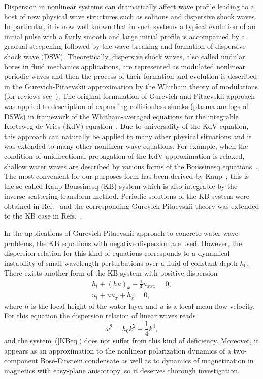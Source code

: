 \documentclass[pre,aps,superscriptaddress,twocolumn,floatfix]{revtex4-1}
\begin{document}
Dispersion in nonlinear systems can dramatically affect wave profile leading to a host
of new physical wave structures such as solitons and dispersive shock waves. In particular,
it is now well known that in such systems a typical evolution of an initial pulse with
a fairly smooth and large initial profile is accompanied by a gradual steepening followed
by the wave breaking and formation of dispersive shock wave (DSW). Theoretically,
dispersive shock waves, also called undular bores in fluid mechanics applications,
are represented as modulated nonlinear periodic waves and then the process of their
formation and evolution is described in the Gurevich-Pitaevskii approximation
\cite{GurevichPitaevskii-73} by the Whitham theory of modulations \cite{Whitham-65}
(for reviews see~\cite{ElHoefer-16,Kamchatnov-21}). The original formulation of
Gurevich and Pitaevskii approach was applied to description of expanding collisionless shocks
(plasma analogs of DSWs) in framework of the Whitham-averaged equations for the integrable
Korteweg-de Vries (KdV) equation~\cite{KortewegVries-95,BenjaminLighthill-54}.
Due to universality of the KdV equation, this approach can naturally be applied
to many other physical situations and it was extended to many other nonlinear wave
equations. For example, when the condition of unidirectional
propagation of the KdV approximation is relaxed, shallow water waves are described by
various forms of the Boussinesq equations~\cite{Boussinesq-77}. The most convenient
for our purposes form has been derived by Kaup~\cite{Kaup-75}; this is the so-called
Kaup-Boussinesq (KB) system which is also integrable by the inverse scattering transform
method. Periodic solutions of the KB system were obtained in Ref.~\cite{MatveevYavor-79}
and the corresponding Gurevich-Pitaevskii theory was extended to the KB case in
Refs.~\cite{ElGrimshawPavlov-01,ElGrimshawKamchatnov-05,CongyIvanovKamchatnovPavloff-17}.


In the applications of Gurevich-Pitaevskii approach to concrete water wave problems,
the KB equations with negative dispersion are used.
However, the dispersion relation for this kind of equations corresponds to a dynamical
instability of small wavelength perturbations over a fluid of constant depth $h_0$.
There exists another form of the KB system with positive dispersion
\begin{equation}\label{KBeq}
\begin{array}{l}
h_t+(hu)_x-\frac14u_{xxx}=0,\\
u_t+uu_x+h_x=0,
\end{array}
\end{equation}
where $h$ is  the local height of the water layer and $u$ is a local mean
flow velocity. For this equation the dispersion relation of linear waves reads
\begin{equation}\label{eq2}
\omega^2=h_0k^2+\frac14k^4,
\end{equation}
and the system~(\ref{KBeq}) does not suffer from this kind of deficiency. Moreover,
it appears as an approximation to the nonlinear polarization dynamics of a two-component
Bose-Einstein condensate \cite{IvanovKamchatnovCongyPavloff-17} as well as to dynamics of
magnetization in magnetics with easy-plane anisotropy, so it deserves 
thorough investigation. 
\end{document}

